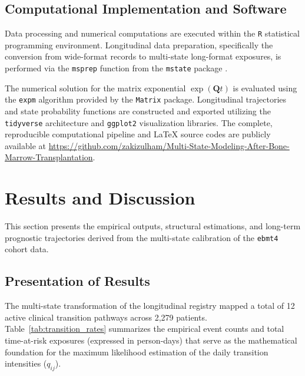\documentclass[9pt,a4paper,twocolumn,twoside]{rho-class/rho}
\begin{document}
    \subsection{Computational Implementation and Software}
        Data processing and numerical computations are executed within the \texttt{R} statistical programming environment. Longitudinal data preparation, specifically the conversion from wide-format records to multi-state long-format exposures, is performed via the \texttt{msprep} function from the \texttt{mstate} package \cite{dewreede2011mstate}. 
        
        The numerical solution for the matrix exponential $\exp(\mathbf{Q}t)$ is evaluated using the \texttt{expm} algorithm provided by the \texttt{Matrix} package. Longitudinal trajectories and state probability functions are constructed and exported utilizing the \texttt{tidyverse} architecture and \texttt{ggplot2} visualization libraries. The complete, reproducible computational pipeline and LaTeX source codes are publicly available at \url{https://github.com/zakizulham/Multi-State-Modeling-After-Bone-Marrow-Transplantation}.

\section{Results and Discussion}
    This section presents the empirical outputs, structural estimations, and long-term prognostic trajectories derived from the multi-state calibration of the \texttt{ebmt4} cohort data.

    \subsection{Presentation of Results}
        The multi-state transformation of the longitudinal registry mapped a total of 12 active clinical transition pathways across 2,279 patients. Table~\ref{tab:transition_rates} summarizes the empirical event counts and total time-at-risk exposures (expressed in person-days) that serve as the mathematical foundation for the maximum likelihood estimation of the daily transition intensities ($q_{ij}$).
\end{document}
